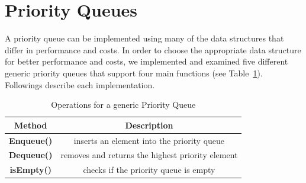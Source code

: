 
\section{Priority Queues}

 A priority queue can be implemented using many of the data structures that differ in performance and costs. In order to choose the appropriate data structure for better performance and costs, we implemented and examined five different generic priority queues that support four main functions (see Table~\ref{tab:PQ_API}). Followings describe each implementation. 

\begin{table}[]
\centering
\begin{tabular}{|c|c|}
\hline

\textbf{Method}   & \textbf{Description}    \\ \hline

	\textbf{Enqueue()}       	& inserts an element into the priority queue                        \\ \hline
	\textbf{Dequeue()}		& removes and returns the highest priority element 		\\ \hline
	\textbf{isEmpty()}			& checks if the priority queue is empty 					\\ \hline

\end{tabular}
\caption{\footnotesize{Operations for a generic Priority Queue}
\label{tab:PQ_API}}
\end{table}


